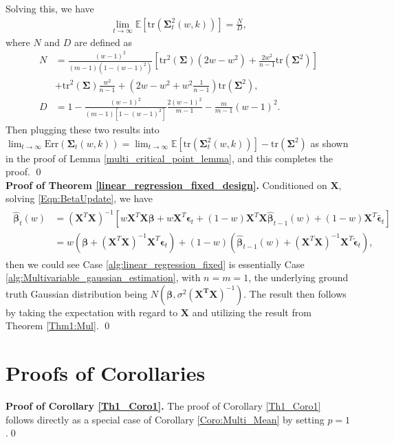 Solving this, we have
\begin{align*}
\lim_{t \to \infty}\mathbb{E}[\mathrm{tr}(\bm \Sigma_t^2(w,k))]=\frac{N}{D},
\end{align*}
where $N$ and $D$ are defined as
\begin{align*}
N & = 
\frac{(w-1)^2}{(m-1)(1-(w-1)^2)}
\left[
\mathrm{tr}^2(\mathbf{\Sigma})(2w-w^2)
+ \frac{2w^2}{n-1}\mathrm{tr}(\mathbf{\Sigma}^2)
\right]
\\ & + \mathrm{tr}^2(\mathbf{\Sigma})\frac{w^2}{n-1}
+ \left(2w-w^2+w^2\frac{1}{n-1}\right)\mathrm{tr}(\mathbf{\Sigma}^2), \\
D& = 
1 
- \frac{(w-1)^2}{(m-1)[1-(w-1)^2]}
\frac{2(w-1)^2}{m-1} 
- \frac{m}{m-1}(w-1)^2.
\end{align*}
Then plugging these two results into $\lim_{t \to \infty} \mathrm{Err}(\mathbf{\Sigma}_t(w,k))=\lim_{t \to \infty}\mathbb{E}\left[\mathrm{tr}(\bm{\Sigma}^2_t(w,k))\right]-\mathrm{tr}(\mathbf{\Sigma}^2)$ as shown in the proof of Lemma \ref{multi_critical_point_lemma}, and this completes the proof. \qed \\

\noindent
\textbf{Proof of Theorem \ref{linear_regression_fixed_design}.} Conditioned on $\mathbf{X}$, solving \eqref{Eqn:BetaUpdate}, we have
\begin{align}
\begin{split}
\widehat{\boldsymbol{\beta}}_t(w)&=(\mathbf{X}^T\mathbf{X})^{-1}[w \mathbf{X}^T\mathbf{X}\boldsymbol{\beta}+w\mathbf{X}^T\boldsymbol{\epsilon}_t+(1-w)\mathbf{X}^T\mathbf{X}\widehat{\boldsymbol{\beta}}_{t-1}(w)+(1-w)\mathbf{X}^T\widetilde{\boldsymbol{\epsilon}_t}]
\\&=w(\boldsymbol{\beta}+(\mathbf{X}^T\mathbf{X})^{-1}\mathbf{X}^T \boldsymbol{\epsilon}_t) +(1-w)(\widehat{\boldsymbol{\beta}}_{t-1}(w)+(\mathbf{X}^T\mathbf{X})^{-1}\mathbf{X}^T \widetilde{\boldsymbol{\epsilon}}_t),
\end{split}
\end{align}
then we could see Case \ref{alg:linear_regression_fixed} is essentially Case \ref{alg:Multivariable_gaussian_estimation}, with $n=m=1$, the underlying ground truth Gaussian distribution being $N(\boldsymbol{\beta}, \sigma^2(\mathbf{X^T X})^{-1})$. The result then follows by taking the expectation with regard to $\mathbf{X}$ and utilizing the result from Theorem \ref{Thm1:Mul}. \qed \\



\section{Proofs of Corollaries}
\textbf{Proof of Corollary \ref{Th1_Coro1}.} The proof of Corollary \ref{Th1_Coro1} follows directly as a special case of Corollary \ref{Coro:Multi_Mean} by setting $p=1$.\qed \\

